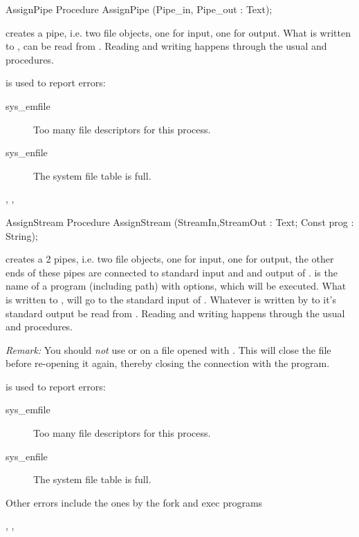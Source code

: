 \html{}
\begin{procedure}{AssignPipe}
\Declaration
Procedure AssignPipe (Pipe\_in, Pipe\_out : Text);

\Description
{} creates a pipe, i.e. two file objects, one for input, one for output.
What is written to , can be read from .
Reading and writing happens through the usual  and
 procedures.

\Errors
  is used to report errors:
\begin{description}
\item[sys\_emfile] Too many file descriptors for this process.
\item[sys\_enfile] The system file table is full.
\end{description}

\SeeAlso
{}, , 
\end{procedure}
\html{}
\begin{procedure}{AssignStream}
\Declaration
Procedure AssignStream (StreamIn,StreamOut : Text; Const prog : String);

\Description
{} creates a 2 pipes, i.e. two file objects, one for input, one for
output, the other ends of these pipes are connected to standard input and and
output of .  is the name of a program (including path)
with options, which will be executed.
What is written to , will go to the standard input of
. Whatever is written by  to it's standard output be read from
.
Reading and writing happens through the usual  and
 procedures.

{\em Remark:} You should {\em not} use  or  on a 
file opened with . This will close the file before re-opening 
it again, thereby closing the connection with the program.

\Errors
  is used to report errors:
\begin{description}
\item[sys\_emfile] Too many file descriptors for this process.
\item[sys\_enfile] The system file table is full.
\end{description}
Other errors include the ones by the fork and exec programs

\SeeAlso
{}, ,
\end{procedure}
